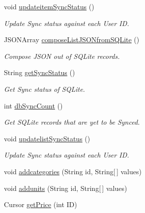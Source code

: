 \begin{DoxyCompactItemize}
void \hyperlink{classcom_1_1example_1_1santh_1_1shoppinglist_1_1_data_base_manager_a3889f14556813bab328222f9c8831446}{updateitem\+Sync\+Status} ()
\begin{DoxyCompactList}\small\item\em Update Sync status against each User ID. \end{DoxyCompactList}\item 
J\+S\+O\+N\+Array \hyperlink{classcom_1_1example_1_1santh_1_1shoppinglist_1_1_data_base_manager_aaf8610923f0af477c21e8d9fcc8fc17d}{compose\+List\+J\+S\+O\+Nfrom\+S\+Q\+Lite} ()
\begin{DoxyCompactList}\small\item\em Compose J\+S\+ON out of S\+Q\+Lite records. \end{DoxyCompactList}\item 
String \hyperlink{classcom_1_1example_1_1santh_1_1shoppinglist_1_1_data_base_manager_a0a5bc82b127a787eac73dbd6227bdb11}{get\+Sync\+Status} ()
\begin{DoxyCompactList}\small\item\em Get Sync status of S\+Q\+Lite. \end{DoxyCompactList}\item 
int \hyperlink{classcom_1_1example_1_1santh_1_1shoppinglist_1_1_data_base_manager_a4c35804ddfcd4f4308c26329f7d0bfeb}{db\+Sync\+Count} ()
\begin{DoxyCompactList}\small\item\em Get S\+Q\+Lite records that are yet to be Synced. \end{DoxyCompactList}\item 
void \hyperlink{classcom_1_1example_1_1santh_1_1shoppinglist_1_1_data_base_manager_a6ce5935808f974585790c32b68a0da2f}{updatelist\+Sync\+Status} ()
\begin{DoxyCompactList}\small\item\em Update Sync status against each User ID. \end{DoxyCompactList}\item 
void \hyperlink{classcom_1_1example_1_1santh_1_1shoppinglist_1_1_data_base_manager_a5d8ff9c9206acc5cc8aa5b16919a612b}{addcategories} (String id, String\mbox{[}$\,$\mbox{]} values)
\item 
void \hyperlink{classcom_1_1example_1_1santh_1_1shoppinglist_1_1_data_base_manager_a48833dce90f84310f3aefc22d15d7901}{addunits} (String id, String\mbox{[}$\,$\mbox{]} values)
\item 
Cursor \hyperlink{classcom_1_1example_1_1santh_1_1shoppinglist_1_1_data_base_manager_a1c523a8b86965b84704dd916910890d0}{get\+Price} (int ID)

\end{DoxyCompactItemize}
